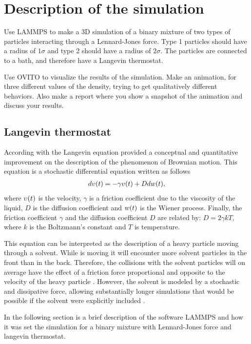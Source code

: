 \documentclass[main.tex]{subfiles}
\begin{document}
\section{Description of the simulation}

Use LAMMPS to make a 3D simulation of a binary mixture of two types of particles interacting through a Lennard-Jones force. 
Type 1 particles should have a radius of $1\sigma$ and type 2 should have a radius of $2\sigma$. The particles are connected to a bath, and therefore have a Langevin thermostat.

Use OVITO to visualize the results of the simulation. Make an animation, for three different values of the density, trying to get qualitatively different behaviors. Also make a report where you show a snapshot of the animation and discuss your results. 

\subsection{Langevin thermostat}

According with \cite{Langevin_equation} the Langevin equation provided a conceptual and quantitative improvement on the description of the phenomenon of Brownian motion.
This equation is a stochastic differential equation written as follows
\begin{gather}
    d\upsilon\qty(t) = -\gamma\upsilon\qty(t)+Ddw\qty(t),
\end{gather}
where $\upsilon\qty(t)$ is the velocity, $\gamma$ is a friction coefficient due to the viscosity of the liquid, $D$ is the diffusion coefficient and $w\qty(t)$ is the Wiener process.
Finally, the friction coefficient $\gamma$ and the diffusion coefficient $D$ are related by: $D=2\gamma kT$, where $k$ is the Boltzmann's constant and $T$ is temperature.

This equation can be interpreted as the description of a heavy particle moving through a solvent.
While is moving it will encounter more solvent particles in the front than in the back.
Therefore, the collisions with the solvent particles will on average have the effect of a friction force proportional and opposite to the velocity of the heavy particle \cite{libroClase}.
However, the solvent is modeled by a stochastic and dissipative force, allowing substantially longer simulations that would be possible if the solvent were explicitly included \cite{Luckhurst_Veracini_2012}.

In the following section is a brief description of the software LAMMPS and how it was set the simulation for a binary mixture with Lennard-Jones force and langevin thermostat.
\end{document}
